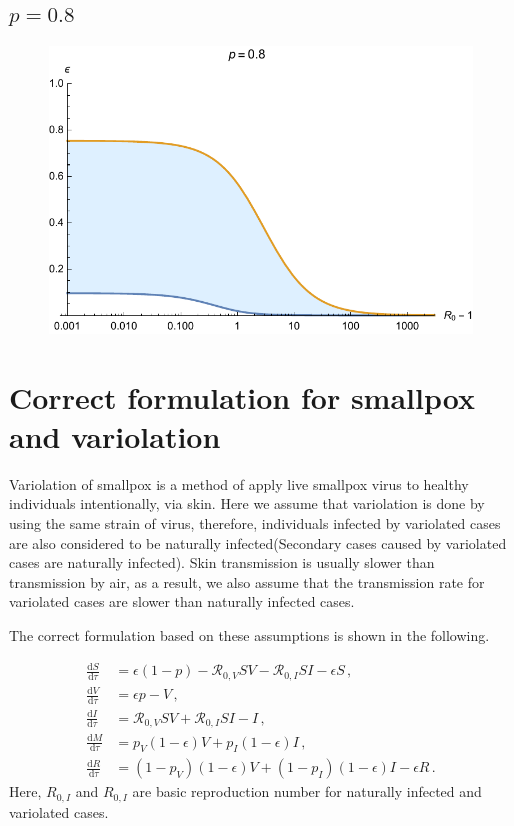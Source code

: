\documentclass[12pt]{article}
\newcommand\dbyd[2]{\frac{\mathrm d{#1}}{\mathrm d{#2}}}
\newcommand{\R}{\mathcal{R}}
\newcommand{\pmV}{p_{V}}
\newcommand{\pmI}{p_{I}}
\begin{document}
\subsection{$p=0.8$}
\begin{figure}[H]
  \caption{}
  \centering
  \includegraphics[width=1\textwidth]{Figures/p_0_8.pdf}
\end{figure}
\clearpage
\section{Correct formulation for smallpox and variolation}

Variolation of smallpox is a method of apply live smallpox virus to healthy individuals intentionally, via skin. Here we assume that variolation is done by using the same strain of virus, therefore, individuals infected by variolated cases are also considered to be naturally infected(Secondary cases caused by variolated cases are naturally infected). Skin transmission is usually slower than transmission by air, as a result, we also assume that the transmission rate for variolated cases are slower than naturally infected cases.

The correct formulation based on these assumptions is shown in the following.

\begin{subequations}\label{eq:base_ODE}
\begin{align}
\dbyd{S}{\tau}&=\epsilon(1-p)-\R_{0,V} SV-\R_{0,I} SI-\epsilon S\,, \label{eq:S_by_tau}\\
\dbyd{V}{\tau}&=\epsilon p-V\,, \label{eq:V_by_tau}\\
\dbyd{I}{\tau}&=\R_{0,V} SV+\R_{0,I} SI-I\,, \label{eq:I_by_tau}\\
\dbyd{M}{\tau}&=\pmV(1-\epsilon) V+\pmI(1-\epsilon) I\,,\\
\dbyd{R}{\tau}&=(1-\pmV)(1-\epsilon) V+(1-\pmI)(1-\epsilon) I-\epsilon R\,.
\end{align}
\end{subequations}
Here, $R_{0,I}$ and $R_{0,I}$ are basic reproduction number for naturally infected and variolated cases.
\end{document}
